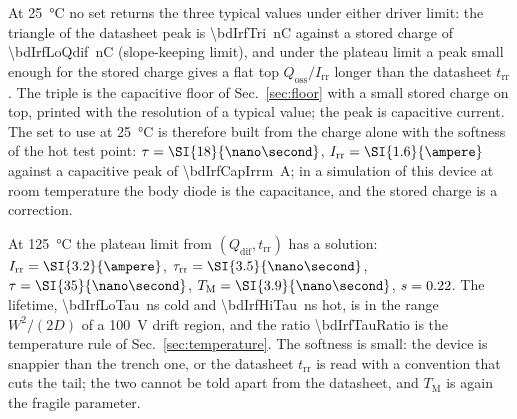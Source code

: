 \documentclass[10pt,a4paper]{scrartcl}
\newcommand{\Irr}{I_\mathrm{rr}}
\newcommand{\Qdif}{Q_\mathrm{dif}}
\newcommand{\Qoss}{Q_\mathrm{oss}}
\newcommand{\trr}{t_\mathrm{rr}}
\newcommand{\taurr}{\tau_\mathrm{rr}}
\newcommand{\TM}{T_\mathrm{M}}
\begin{document}
At \SI{25}{\celsius} no set returns the three typical values under either driver limit: the triangle of the datasheet peak is \SI{\bdIrfTri}{\nano\coulomb} against a stored charge of \SI{\bdIrfLoQdif}{\nano\coulomb} (slope-keeping limit), and under the plateau limit a peak small enough for the stored charge gives a flat top $\Qoss/\Irr$ longer than the datasheet $\trr$. The triple is the capacitive floor of Sec.~\ref{sec:floor} with a small stored charge on top, printed with the resolution of a typical value; the peak is capacitive current. The set to use at \SI{25}{\celsius} is therefore built from the charge alone with the softness of the hot test point: $\tau = \SI{\bdIrfLoTau}{\nano\second}$, $\Irr = \SI{\bdIrfLoIrr}{\ampere}$ against a capacitive peak of \SI{\bdIrfCapIrrm}{\ampere}; in a simulation of this device at room temperature the body diode is the capacitance, and the stored charge is a correction.

At \SI{125}{\celsius} the plateau limit from $(\Qdif, \trr)$ has a solution: $\Irr = \SI{\bdIrfHiIrr}{\ampere}$, $\taurr = \SI{\bdIrfHiTaurr}{\nano\second}$, $\tau = \SI{\bdIrfHiTau}{\nano\second}$, $\TM = \SI{\bdIrfHiTm}{\nano\second}$, $s = 0.22$. The lifetime, \SI{\bdIrfLoTau}{\nano\second} cold and \SI{\bdIrfHiTau}{\nano\second} hot, is in the range $W^2/(2D)$ of a \SI{100}{\volt} drift region, and the ratio \num{\bdIrfTauRatio} is the temperature rule of Sec.~\ref{sec:temperature}. The softness is small: the device is snappier than the trench one, or the datasheet $\trr$ is read with a convention that cuts the tail; the two cannot be told apart from the datasheet, and $\TM$ is again the fragile parameter.
\end{document}
